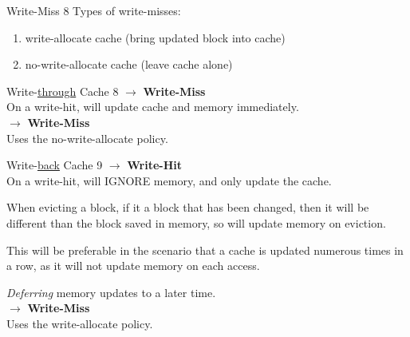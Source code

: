 \documentclass{report}
\begin{document}
    \begin{definition} {Write-Miss} { 8 }
      Types of write-misses:
      \begin{enumerate}
        \item write-allocate cache (bring updated block into cache)
        \item no-write-allocate cache (leave cache alone) \\
      \end{enumerate}
      
    \end{definition}
    
    \begin{example} {Write-\underline{through} Cache} { 8 }
      $\to$ \textbf{Write-Miss} \\
      On a write-hit, will update cache and memory immediately. \\

      $\to$ \textbf{Write-Miss} \\
      Uses the no-write-allocate policy. \\
    \end{example}  
    \begin{example} {Write-\underline{back} Cache} { 9 }
      $\to$ \textbf{Write-Hit} \\
      On a write-hit, will IGNORE memory, and only update the cache. \\
      \par When evicting a block, if it a block that has been changed, then it will be different than the block saved in memory, so will update memory on eviction. \\
      \par This will be preferable in the scenario that a cache is updated numerous times in a row, as it will not update memory on each access. \\
      \par \emph{Deferring} memory updates to a later time. \\

      $\to$ \textbf{Write-Miss} \\
      Uses the write-allocate policy. \\
    \end{example}  
\end{document}
